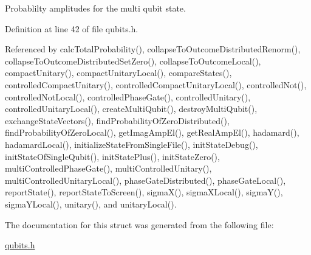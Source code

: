 Probablilty amplitudes for the multi qubit state. 

Definition at line 42 of file qubits.h.

Referenced by calcTotalProbability(), collapseToOutcomeDistributedRenorm(), collapseToOutcomeDistributedSetZero(), collapseToOutcomeLocal(), compactUnitary(), compactUnitaryLocal(), compareStates(), controlledCompactUnitary(), controlledCompactUnitaryLocal(), controlledNot(), controlledNotLocal(), controlledPhaseGate(), controlledUnitary(), controlledUnitaryLocal(), createMultiQubit(), destroyMultiQubit(), exchangeStateVectors(), findProbabilityOfZeroDistributed(), findProbabilityOfZeroLocal(), getImagAmpEl(), getRealAmpEl(), hadamard(), hadamardLocal(), initializeStateFromSingleFile(), initStateDebug(), initStateOfSingleQubit(), initStatePlus(), initStateZero(), multiControlledPhaseGate(), multiControlledUnitary(), multiControlledUnitaryLocal(), phaseGateDistributed(), phaseGateLocal(), reportState(), reportStateToScreen(), sigmaX(), sigmaXLocal(), sigmaY(), sigmaYLocal(), unitary(), and unitaryLocal().

The documentation for this struct was generated from the following file:\begin{DoxyCompactItemize}
\item 
\hyperlink{qubits_8h}{qubits.h}\end{DoxyCompactItemize}
